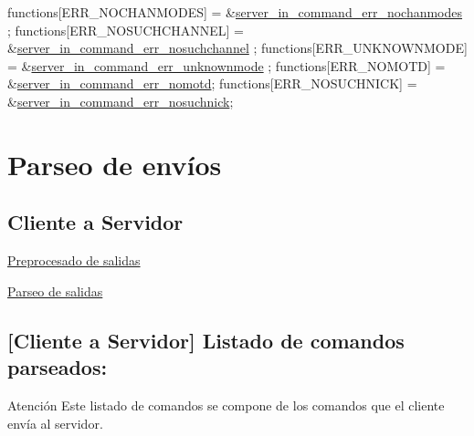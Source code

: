 \begin{DoxyCode}
functions[ERR\_NOCHANMODES]            = &\hyperlink{G-2313-06-P2__client__err__handlers_8h_aade31864807344a9961ffdab697b5727}{server\_in\_command\_err\_nochanmodes}
      ;
functions[ERR\_NOSUCHCHANNEL]          = &\hyperlink{G-2313-06-P2__client__err__handlers_8h_a83109e15e2a8f93c9523a84a546098c0}{server\_in\_command\_err\_nosuchchannel}
      ;
functions[ERR\_UNKNOWNMODE]            = &\hyperlink{G-2313-06-P2__client__err__handlers_8h_af262f3569e06c21e3e466266fa4e2c80}{server\_in\_command\_err\_unknownmode}
      ;
functions[ERR\_NOMOTD]                 = &\hyperlink{G-2313-06-P2__client__err__handlers_8h_a678f368edc1fd437f5f115ef897bdcd9}{server\_in\_command\_err\_nomotd};
functions[ERR\_NOSUCHNICK]             = &\hyperlink{G-2313-06-P2__client__err__handlers_8h_a01f8c9822aac18d5424ebbaf67c06a51}{server\_in\_command\_err\_nosuchnick};
\end{DoxyCode}
 \section*{Parseo de envíos}

\subsection*{Cliente a Servidor}


\begin{DoxyItemize}
\item \hyperlink{client_pre_out_function}{Preprocesado de salidas} 
\item \hyperlink{client_execute_out_function}{Parseo de salidas} 
\end{DoxyItemize}

\subsection*{\mbox{[}Cliente a Servidor\mbox{]} Listado de comandos parseados\+:}

\begin{DoxyWarning}{Atención}
Este listado de comandos se compone de los comandos que el cliente envía al servidor.
\end{DoxyWarning}

